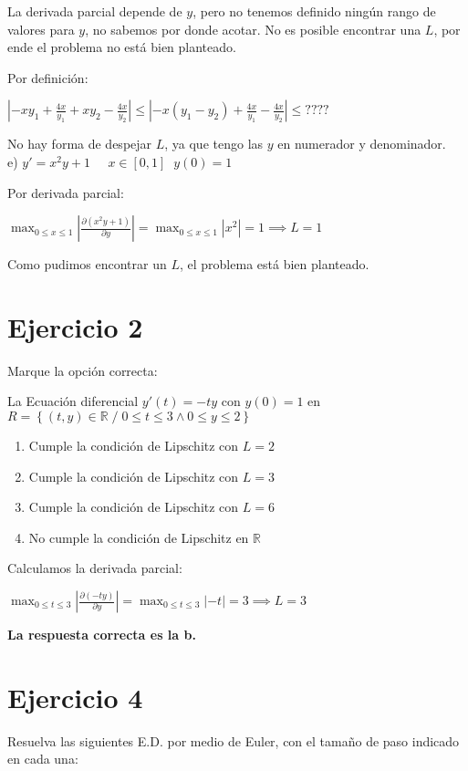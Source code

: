 \documentclass[11pt]{article}
\begin{document}
	La derivada parcial depende de $y$, pero no tenemos definido ningún rango de valores para $y$, no sabemos por donde acotar. No es posible encontrar una $L$, por ende el problema no está bien planteado.
	
	Por definición:
	
	$\displaystyle \left|-xy_1+\frac{4x}{y_1}+xy_2-\frac{4x}{y_2}\right| \le \left|-x(y_1-y_2)+\frac{4x}{y_1}-\frac{4x}{y_2}\right| \le ????$
	
	No hay forma de despejar $L$, ya que tengo las $y$ en numerador y denominador.\\
	
	e) $y'=x^2y+1 \;\;\;\;\; x\in[0,1] \;\; y(0)=1$
	
	Por derivada parcial:
	
	$\displaystyle \max_{0\le x \le 1} \left|\frac{\partial (x^2y+1)}{\partial y}\right|=\max_{0 \le x \le 1} \left|x^2\right|=1 \implies L=1$
	
	Como pudimos encontrar un $L$, el problema está bien planteado.

	\section{Ejercicio 2}
	Marque la opción correcta:
	
	La Ecuación diferencial $y'(t)=-ty$ con $y(0)=1$ en $R=\left\lbrace(t,y) \in \mathbb{R} \;/\; 0\le t \le 3 \wedge 0\le y \le 2 \right\rbrace$
	
	\begin{enumerate}[label=\alph*)]
		\item Cumple la condición de Lipschitz con $L=2$
		\item Cumple la condición de Lipschitz con $L=3$
		\item Cumple la condición de Lipschitz con $L=6$
		\item No cumple la condición de Lipschitz en $\mathbb{R}$
	\end{enumerate}

	Calculamos la derivada parcial:
	
	$\displaystyle \max_{0\le t \le 3} \left|\frac{\partial (-ty)}{\partial y}\right|=\max_{0 \le t \le 3} |-t|=3 \implies L=3$
	
	\textbf{La respuesta correcta es la b.}

	\section{Ejercicio 4}
	Resuelva las siguientes E.D. por medio de Euler, con el tamaño de paso indicado en cada una:
	
\end{document}
